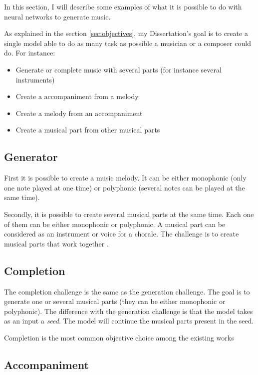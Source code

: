 \documentclass[12pt]{report}
\begin{document}
In this section, I will describe some examples of what it is possible to do with neural networks to generate music.

As explained in the section \ref{sec:objectives}, my Dissertation's goal is to create a single model able to do as many task as possible a musician or a composer could do.
For instance:
\begin{itemize}
    \item Generate or complete music with several parts (for instance several instruments)
    \item Create a accompaniment from a melody
    \item Create a melody from an accompaniment
    \item Create a musical part from other musical parts
\end{itemize}

\subsection{Generator}

First it is possible to create a music melody. It can be either monophonic (only one note played at one time) or polyphonic (several notes can be played at the same time).

Secondly, it is possible to create several musical parts at the same time. Each one of them can be either monophonic or polyphonic.
A musical part can be considered as an instrument or voice for a chorale.
The challenge is to create musical parts that work together \cite{donahue_adversarial_2019}.

\subsection{Completion}

The completion challenge is the same as the generation challenge.
The goal is to generate one or several musical parts (they can be either monophonic or polyphonic).
The difference with the generation challenge is that the model takes as an input a \textit{seed}.
The model will continue the musical parts present in the seed.

Completion is the most common objective choice among the existing works \cite{liang_automatic_2017, chuan_modeling_nodate, huang_counterpoint_2017, boulanger-lewandowski_modeling_2012, lattner_imposing_2018}

\subsection{Accompaniment}
\end{document}
